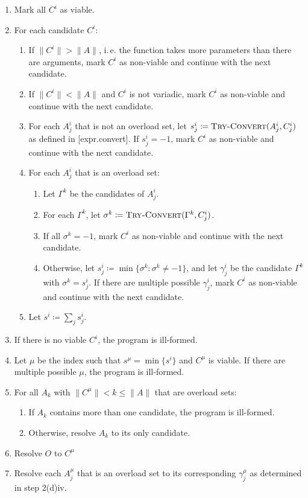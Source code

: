 \documentclass[a4paper, 12pt, oneside, final]{article}
\begin{document}
\begin{enumerate}
\item Mark all $C^i$ as viable.
\item For each candidate $C^i$:
    \begin{enumerate}
        \item If $\|C^i\| > \|A\|$, i.\,e. the function takes more parameters than there are arguments, mark $C^i$ as
              non-viable and continue with the next candidate.
        \item If $\|C^i\| < \|A\|$ and $C^i$ is not variadic, mark $C^i$ as non-viable and continue with the next candidate.
        \item For each $A^i_j$ that is not an overload set, let $s^i_j \coloneqq \text{\scshape Try-Convert}(A^i_j, C^i_j)$
              as defined in [expr.convert]. If $s^i_j = -1$, mark $C^i$ as non-viable and continue with the next candidate.
        \item For each $A^i_j$ that is an overload set:
            \begin{enumerate}
                \item Let $\Gamma^k$ be the candidates of $A^i_j$.
                \item For each $\Gamma^k$, let $\sigma^k \coloneqq \text{\scshape Try-Convert}(\Gamma^k, C^i_j)$.
                \item If all $\sigma^k = -1$, mark $C^i$ as non-viable and continue with the next candidate.
                \item Otherwise, let $s^i_j \coloneqq \min \{ \sigma^k : \sigma^k \neq -1 \}$, and let $\gamma^i_j$ be the
                      candidate $\Gamma^k$ with $\sigma^k = s^i_j$. If there are multiple possible $\gamma^i_j$,
                      mark $C^i$ as non-viable and continue with the next candidate.
            \end{enumerate}
        \item Let $s^i \coloneqq \sum_j s^i_j$.
    \end{enumerate}
\item If there is no viable $C^i$, the program is ill-formed.
\item Let $\mu$ be the index such that $s^\mu = \min \{ s^i \}$ and $C^\mu$ is viable. If there are multiple possible $\mu$, the program is
      ill-formed.
\item For all $A_k$ with $\|C^\mu\| < k \leq \|A\|$ that are overload sets:
    \begin{enumerate}
        \item If $A_k$ contains more than one candidate, the program is ill-formed.
        \item Otherwise, resolve $A_k$ to its only candidate.
    \end{enumerate}
\item Resolve $O$ to $C^\mu$
\item Resolve each $A^\mu_j$ that is an overload set to its corresponding $\gamma^\mu_j$ as determined in step 2(d)iv.
\end{enumerate}
\end{document}
